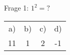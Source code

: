 \documentclass[margin=0.2cm, varwidth]{standalone}
\begin{document}
\centering
Frage 1: $1^2 = ?$ \newline

\begin{tabular}{c c c c}
a) & b) & c) & d) \\
11 & 1 & 2 & -1 \\
\end{tabular}
\end{document}
